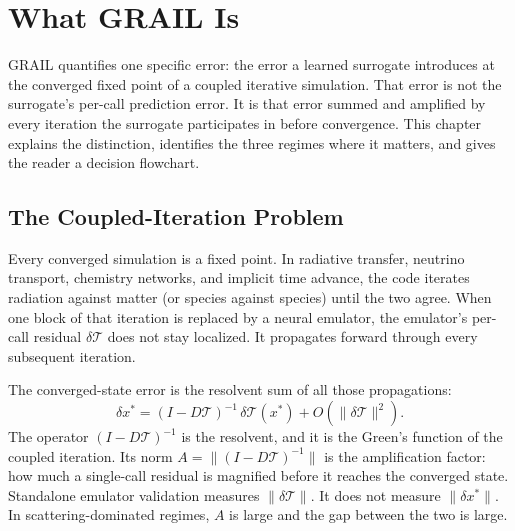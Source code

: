 %
%
%

\chapter{What GRAIL Is}
\label{ch:what}


GRAIL quantifies one specific error: the error a learned surrogate introduces
at the converged fixed point of a coupled iterative simulation.
That error is not the surrogate's per-call prediction error.
It is that error summed and amplified by every iteration the surrogate
participates in before convergence.
This chapter explains the distinction, identifies the three regimes where
it matters, and gives the reader a decision flowchart.

\section{The Coupled-Iteration Problem}
\label{sec:coupled-problem}


Every converged simulation is a fixed point.
In radiative transfer, neutrino transport, chemistry networks, and
implicit time advance, the code iterates radiation against matter
(or species against species) until the two agree.
When one block of that iteration is replaced by a neural emulator,
the emulator's per-call residual $\delta\mathcal{T}$ does not stay localized.
It propagates forward through every subsequent iteration.

The converged-state error is the resolvent sum of all those propagations:
\[
  \delta x^* = (I - D\mathcal{T})^{-1}\,\delta\mathcal{T}(x^*) + O(\|\delta\mathcal{T}\|^2).
\]
The operator $(I - D\mathcal{T})^{-1}$ is the resolvent, and it is
the Green's function of the coupled iteration.
Its norm $A = \|(I - D\mathcal{T})^{-1}\|$ is the amplification factor:
how much a single-call residual is magnified before it reaches the converged state.
Standalone emulator validation measures $\|\delta\mathcal{T}\|$.
It does not measure $\|\delta x^*\|$.
In scattering-dominated regimes, $A$ is large and the gap between the two is large.

